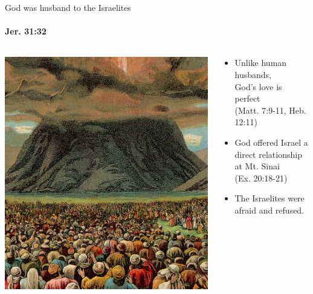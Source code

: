\begin{frame}{God was husband to the Israelites}
\framesubtitle{Jer. 31:32}

\begin{columns}[c]
\begin{column}{0.4\textwidth}
	\includegraphics[width=\columnwidth]{figures/mountSinai.jpg}
\end{column}
\begin{column}{0.6\textwidth}
	\begin{itemize}
		\item Unlike human husbands,\\God's love is perfect\\{\footnotesize(Matt. 7:9-11, Heb. 12:11)}
    \item God offered Israel a direct relationship at Mt. Sinai\\{\footnotesize(Ex. 20:18-21)}
		\item The Israelites were afraid and refused.
	\end{itemize}
\end{column}
\end{columns}


\end{frame}
